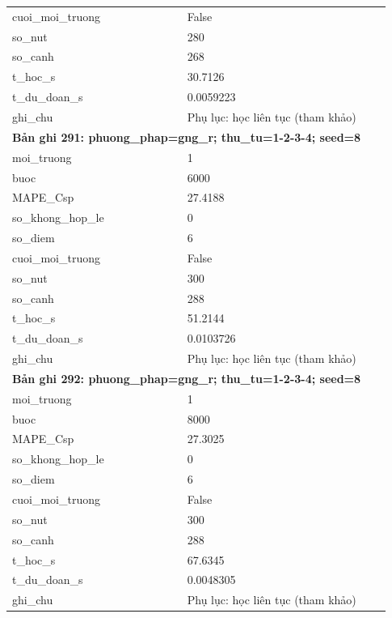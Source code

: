\begin{longtable}{p{0.43\linewidth}p{0.50\linewidth}}
cuoi\_\allowbreak moi\_\allowbreak truong & False \\
so\_\allowbreak nut & 280 \\
so\_\allowbreak canh & 268 \\
t\_\allowbreak hoc\_\allowbreak s & 30.7126 \\
t\_\allowbreak du\_\allowbreak doan\_\allowbreak s & 0.0059223 \\
ghi\_\allowbreak chu & Phụ lục: học liên tục (tham khảo) \\
\midrule
\multicolumn{2}{p{0.95\linewidth}}{\textbf{Bản ghi 291: phuong\_phap=gng\_r; thu\_tu=1-2-3-4; seed=8}} \\
moi\_\allowbreak truong & 1 \\
buoc & 6000 \\
MAPE\_\allowbreak Csp & 27.4188 \\
so\_\allowbreak khong\_\allowbreak hop\_\allowbreak le & 0 \\
so\_\allowbreak diem & 6 \\
cuoi\_\allowbreak moi\_\allowbreak truong & False \\
so\_\allowbreak nut & 300 \\
so\_\allowbreak canh & 288 \\
t\_\allowbreak hoc\_\allowbreak s & 51.2144 \\
t\_\allowbreak du\_\allowbreak doan\_\allowbreak s & 0.0103726 \\
ghi\_\allowbreak chu & Phụ lục: học liên tục (tham khảo) \\
\midrule
\multicolumn{2}{p{0.95\linewidth}}{\textbf{Bản ghi 292: phuong\_phap=gng\_r; thu\_tu=1-2-3-4; seed=8}} \\
moi\_\allowbreak truong & 1 \\
buoc & 8000 \\
MAPE\_\allowbreak Csp & 27.3025 \\
so\_\allowbreak khong\_\allowbreak hop\_\allowbreak le & 0 \\
so\_\allowbreak diem & 6 \\
cuoi\_\allowbreak moi\_\allowbreak truong & False \\
so\_\allowbreak nut & 300 \\
so\_\allowbreak canh & 288 \\
t\_\allowbreak hoc\_\allowbreak s & 67.6345 \\
t\_\allowbreak du\_\allowbreak doan\_\allowbreak s & 0.0048305 \\
ghi\_\allowbreak chu & Phụ lục: học liên tục (tham khảo) \\

\end{longtable}
